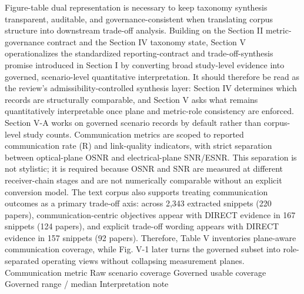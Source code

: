 {} Figure-table dual representation is necessary to keep taxonomy synthesis transparent, auditable, and governance-consistent when translating corpus structure into downstream trade-off analysis.\markdownRendererParagraphSeparator
{}
\markdownRendererSectionEnd 
\markdownRendererSectionEnd 
\markdownRendererSectionEnd \markdownRendererSectionBegin
{}\markdownRendererInterblockSeparator
{}Building on the Section II metric-governance contract and the Section IV taxonomy state, Section V operationalizes the standardized reporting-contract and trade-off-synthesis promise introduced in Section I by converting broad study-level evidence into governed, scenario-level quantitative interpretation. It should therefore be read as the review's admissibility-controlled synthesis layer: Section IV determines which records are structurally comparable, and Section V asks what remains quantitatively interpretable once plane and metric-role consistency are enforced.\markdownRendererInterblockSeparator
{}\markdownRendererSectionBegin
{}\markdownRendererInterblockSeparator
{}Section V-A works on governed scenario records by default rather than corpus-level study counts. Communication metrics are scoped to reported communication rate (R) and link-quality indicators, with strict separation between optical-plane OSNR and electrical-plane SNR/ESNR. This separation is not stylistic; it is required because OSNR and SNR are measured at different receiver-chain stages and are not numerically comparable without an explicit conversion model. The text corpus also supports treating communication outcomes as a primary trade-off axis: across 2,343 extracted snippets (220 papers), communication-centric objectives appear with DIRECT evidence in 167 snippets (124 papers), and explicit trade-off wording appears with DIRECT evidence in 157 snippets (92 papers). Therefore, Table V inventories plane-aware communication coverage, while Fig. V-1 later turns the governed subset into role-separated operating views without collapsing measurement planes.\markdownRendererInterblockSeparator
{}\markdownRendererSectionBegin
{}\markdownRendererInterblockSeparator
{}\markdownRendererPipe{} Communication metric \markdownRendererPipe{} Raw scenario coverage \markdownRendererPipe{} Governed usable coverage \markdownRendererPipe{} Governed range / median \markdownRendererPipe{} Interpretation note \markdownRendererPipe{}\markdownRendererSoftLineBreak
